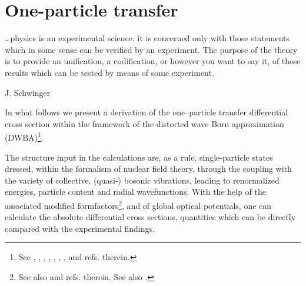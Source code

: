 \chapter{One-particle transfer}\label{C6}
	 \epigraph{\dots physics is an experimental science: it is concerned only with those statements which in some sense can be verified by an experiment. The purpose of the theory is to provide an unification, a codification, or however you want to say it, of those results which can be tested by means of some experiment.}{J. Schwinger}
In what follows we present a derivation of the one--particle transfer differential cross section within the framework of the distorted wave Born approximation (DWBA)\footnote{See \cite{Tobocman:61}, \cite{Austern:63}, \cite{Jackson:70} \citet{Satchler:80}, \cite{Satchler:83}, \cite{Austern:70}, \cite{Glendenning:04}, \cite{Thompson:09},  and refs. therein.}.



 The structure input in the calculations are, as a rule,  single-particle states dressed, within the formalism of nuclear field theory, through the coupling with the variety of collective, (quasi-) bosonic vibrations, leading to renormalized energies, particle content and  radial wavefunctions. With the help of the associated modified formfactors\footnote{See also \cite{Pinkston:82,Vaagen:79,Bang:80,Hamamoto:70} and refs. therein. See also \cite{Barranco:17}.}, and of global optical potentials, one can calculate the absolute differential cross sections, quantities which can  be directly compared with the experimental findings.
	
